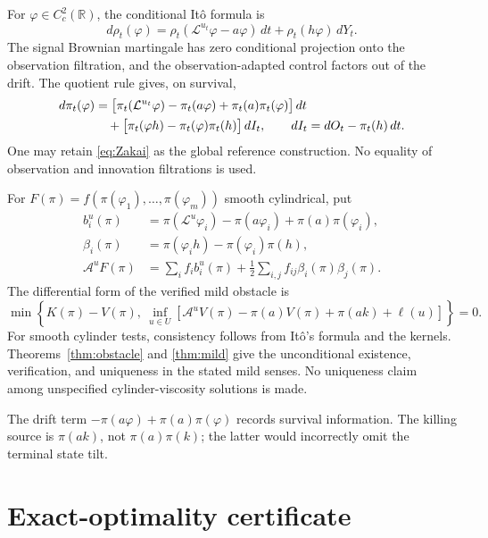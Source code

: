 \documentclass[11pt,a4paper]{article}
\theoremstyle{definition}
\theoremstyle{remark}
\newcommand{\R}{\mathbb R}
\begin{document}
For \(\varphi\in C_c^2(\R)\), the conditional Itô formula is
\begin{equation}\label{eq:Zakai}
 d\rho_t(\varphi)=
 \rho_t(\mathcal L^{u_t}\varphi-a\varphi)\,dt
                        +\rho_t(h\varphi)\,dY_t.
\end{equation}
The signal Brownian martingale has zero conditional projection
onto the observation filtration, and the observation-adapted
control factors out of the drift.
The quotient rule gives, on survival,
\begin{align}
 d\pi_t(\varphi)
 &=\big[\pi_t(\mathcal L^{u_t}\varphi)-\pi_t(a\varphi)
                   +\pi_t(a)\pi_t(\varphi)\big]\,dt\notag\\
 &\quad+
 \big[\pi_t(\varphi h)-\pi_t(\varphi)\pi_t(h)\big]\,dI_t,
 \qquad dI_t=dO_t-\pi_t(h)\,dt.                    \label{eq:KS}
\end{align}
One may retain \eqref{eq:Zakai} as the global reference construction.
No equality of observation and innovation filtrations is used.

For \(F(\pi)=f(\pi(\varphi_1),\ldots,\pi(\varphi_m))\) smooth
cylindrical, put
\begin{align*}
 b_i^u(\pi)&=\pi(\mathcal L^u\varphi_i)-\pi(a\varphi_i)
                                  +\pi(a)\pi(\varphi_i),\\
 \beta_i(\pi)&=\pi(\varphi_ih)-\pi(\varphi_i)\pi(h),\\
 \mathscr A^uF(\pi)&=\sum_i f_ib_i^u(\pi)
              +\frac12\sum_{i,j}f_{ij}\beta_i(\pi)\beta_j(\pi).
\end{align*}
The differential form of the verified mild obstacle is
\begin{equation}\label{eq:PDE}
 \min\left\{K(\pi)-V(\pi),\
 \inf_{u\in U}
 [\mathscr A^uV(\pi)-\pi(a)V(\pi)+\pi(ak)+\ell(u)]\right\}=0.
\end{equation}
For smooth cylinder tests, consistency follows from Itô's formula
and the kernels. Theorems~\ref{thm:obstacle} and \ref{thm:mild}
give the unconditional existence, verification, and uniqueness
in the stated mild senses. No uniqueness claim among unspecified
cylinder-viscosity solutions is made.

The drift term
\(-\pi(a\varphi)+\pi(a)\pi(\varphi)\) records survival information.
The killing source is \(\pi(ak)\), not \(\pi(a)\pi(k)\);
the latter would incorrectly omit the terminal state tilt.

\section{Exact-optimality certificate}
\end{document}
